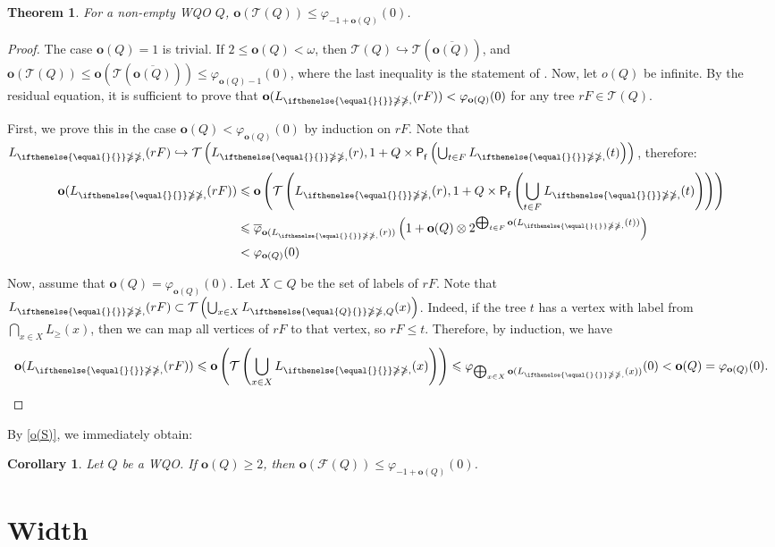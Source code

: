 \documentclass[runningheads]{llncs}
\let \leq \leqslant
\let \geq \geqslant
\let \ngeq \ngeqslant
\let \phi \varphi
\let \embeds \hookrightarrow
\renewcommand \L [2][]{L_{\ifthenelse{\equal{#1}{}}\ngeq{\ngeq,#1}}(#2)}
\renewcommand \l [2][]{\o(\L[#1]{#2})}
\renewcommand \S [1][]{\mathsf{P_f^{#1}}}
\def \T {\mathcal{T}}
\def \F {\mathcal{F}}
\def \o {\textbf{o}}
\newtheorem{theorem}{Theorem}
\newtheorem{corollary}{Corollary}
\begin{document}
\begin{theorem}
    For a non-empty WQO $Q$, $\o(\T(Q)) \leq \phi_{-1 + \o(Q)}(0)$.
\end{theorem}
\begin{proof}
    The case $\o(Q) = 1$ is trivial. If $2 \leq \o(Q) < \omega$, then $\T(Q) \embeds \T\left(\overline{\o(Q)}\right)$, and $\o(\T(Q)) \leq \o\left(\T\left(\overline{\o(Q)}\right)\right) \leq \phi_{\o(Q)-1}(0)$, where the last inequality is the statement of \cite[proposition 1]{Selivanov2025}. Now, let $o(Q)$ be infinite. By the residual equation, it is sufficient to prove that $\l{rF} < \phi_{\o(Q)}(0)$ for any tree $rF \in \T(Q)$.
    
    First, we prove this in the case $\o(Q) < \phi_{\o(Q)}(0)$ by induction on $rF$. Note that $\L{rF} \embeds \T\left(\L{r}, 1 + Q \times \S\left(\bigcup_{t \in F} \L{t}\right)\right)$, therefore:
    \begin{align*}
        \l{rF}
        &\leq \o\left(\T\left(\L{r}, 1 + Q \times \S\left(\bigcup_{t \in F} \L{t}\right)\right)\right)\\
        &\leq \overline{\phi}_{\l{r}}\left(1 + \o(Q) \otimes 2^{\bigoplus_{t \in F} \l{t}}\right)\\
        &< \phi_{\o(Q)}(0)
    \end{align*}
    
    Now, assume that $\o(Q) = \phi_{\o(Q)}(0)$. Let $X \subset Q$ be the set of labels of $rF$. Note that $\L{rF} \subset \T\left(\bigcup_{x \in X} \L[Q]{x}\right)$. Indeed, if the tree $t$ has a vertex with label from $\bigcap_{x \in X} L_\geq(x)$, then we can map all vertices of $rF$ to that vertex, so $rF \leq t$. Therefore, by induction, we have 
    $$\l{rF} \leq \o\left(\T\left(\bigcup_{x \in X} \L{x}\right)\right) \leq \phi_{\bigoplus_{x \in X} \l{x}}(0) < \o(Q) = \phi_{\o(Q)}(0).$$
\end{proof}

By \cref{o(S)}, we immediately obtain:

\begin{corollary}
    Let $Q$ be a WQO. If $\o(Q) \geq 2$, then $\o(\F(Q)) \leq \phi_{-1+\o(Q)}(0)$.
\end{corollary}







\section{Width}\label{section w}
\end{document}

